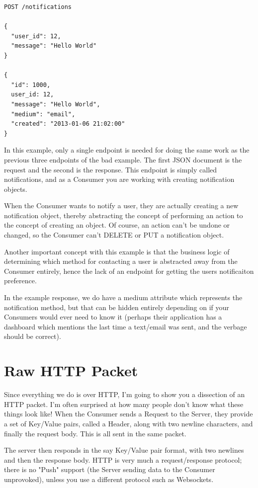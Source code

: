 \documentclass{book}
\begin{document}
\begin{verbatim}
POST /notifications

{
  "user_id": 12,
  "message": "Hello World"
}

{
  "id": 1000,
  user_id: 12,
  "message": "Hello World",
  "medium": "email",
  "created": "2013-01-06 21:02:00"
}
\end{verbatim}

In this example, only a single endpoint is needed for doing the same work as the previous three endpoints of the bad example. The first JSON document is the request and the second is the response. This endpoint is simply called notifications, and as a Consumer you are working with creating notification objects.

When the Consumer wants to notify a user, they are actually creating a new notification object, thereby abstracting the concept of performing an action to the concept of creating an object. Of course, an action can't be undone or changed, so the Consumer can't DELETE or PUT a notification object.

Another important concept with this example is that the business logic of determining which method for contacting a user is abstracted away from the Consumer entirely, hence the lack of an endpoint for getting the users notificaiton preference.

In the example response, we do have a medium attribute which represents the notification method, but that can be hidden entirely depending on if your Consumers would ever need to know it (perhaps their application has a dashboard which mentions the last time a text/email was sent, and the verbage should be correct).

\chapter{Raw HTTP Packet}

Since everything we do is over HTTP, I'm going to show you a dissection of an HTTP packet. I'm often surprised at how many people don't know what these things look like! When the Consumer sends a Request to the Server, they provide a set of Key/Value pairs, called a Header, along with two newline characters, and finally the request body. This is all sent in the same packet.

The server then responds in the say Key/Value pair format, with two newlines and then the response body. HTTP is very much a request/response protocol; there is no "Push" support (the Server sending data to the Consumer unprovoked), unless you use a different protocol such as Websockets.
\end{document}
